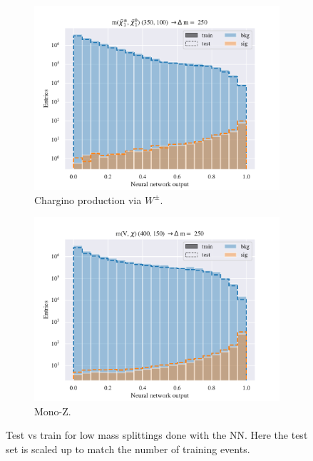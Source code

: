\begin{figure}[H]
    \begin{subfigure}[t!]{0.49\textwidth}
        \includegraphics[width = \textwidth]{Figures/WW/NN/High_level/Inter/scaled_train_test_395320.pdf}
        \caption{Chargino production via $W^\pm$.}
        \label{fig:WWNNLow}
    \end{subfigure}
    \begin{subfigure}[t!]{0.49\textwidth}
        \includegraphics[width = \textwidth]{Figures/Mono_Z/ML/NN/High_level/Inter/scaled_train_test_310613.pdf}
        \caption{Mono-Z.}
        \label{fig:MonoZNNLow}
    \end{subfigure}
    \caption{Test vs train for low mass splittings done with the NN. Here the test set is scaled up to match the number of training events.}
    \label{fig:AllLowNN}
\end{figure}


